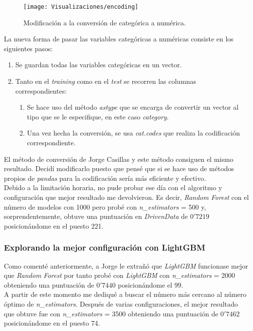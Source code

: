 \documentclass[paper=a4, fontsize=12pt]{article} %
\numberwithin{equation}{section} %
\numberwithin{figure}{section} %
\numberwithin{table}{section} %
\begin{document}
\begin{figure}[H]
  \centering
  \texttt{[image: Visualizaciones/encoding]}
  \caption{Modificación a la conversión de categórica a numérica.}
  \label{encoding}
\end{figure}

La nueva forma de pasar las variables categóricas a numéricas consiste en los siguientes pasos:

\begin{enumerate}
\item Se guardan todas las variables categóricas en un vector.
\item Tanto en el \textit{training} como en el \textit{test} se recorren las columnas correspondientes:
	\begin{enumerate}
	\item Se hace uso del método \textit{astype} que se encarga de convertir un vector al tipo que se le especifique, en este caso \textit{category}.
	\item Una vez hecha la conversión, se usa \textit{cat.codes} que realiza la codificación correspondiente.
	\end{enumerate}
\end{enumerate}

El método de conversión de Jorge Casillas y este método consiguen el mismo resultado. Decidí modificarlo puesto que pensé que si se hace uso de métodos propios de \textit{pandas} para la codificación sería más eficiente y efectivo.\\

Debido a la limitación horaria, no pude probar ese día con el algoritmo y configuración que mejor resultado me devolvieron. Es decir, \textit{Random Forest} con el número de modelos con 1000 pero probé con \textit{n\_estimators} = 500 y, sorprendentemente, obtuve una puntuación en \textit{DrivenData} de $0'7219$ posicionándome en el puesto 221.

\subsubsection {Explorando la mejor configuración con LightGBM}
Como comenté anteriormente, a Jorge le extrañó que \textit{LightGBM} funcionase mejor que \textit{Random Forest} por tanto probé con \textit{LightGBM} con \textit{n\_estimators} = 2000 obteniendo una puntuación de $0'7440$ posicionándome el 99. \\

A partir de este momento me dediqué a buscar el número más cercano al número óptimo de \textit{n\_estimators}. Después de varias configuraciones, el mejor resultado que obtuve fue con \textit{n\_estimators} = 3500 obteniendo una puntuación de $0'7462$ posicionándome en el puesto 74. \\
\end{document}
